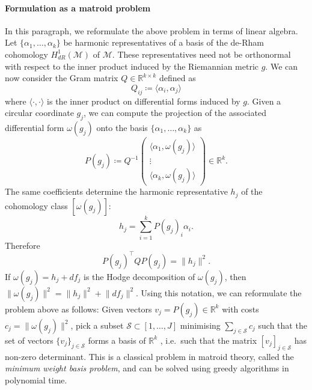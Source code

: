 \documentclass[a4paper,11pt, DIV=10]{scrartcl}
\numberwithin{equation}{section}
\theoremstyle{definition}
\theoremstyle{remark}
\newcommand{\R}{\mathbb{R}}
\newcommand{\mc}[1]{\mathcal{#1}}
\begin{document}
\paragraph{Formulation as a matroid problem}
In this paragraph, we reformulate the above problem in terms of linear algebra.
Let $\{\alpha_1,\dots, \alpha_k\}$ be harmonic representatives of a basis of the de-Rham cohomology $H^1_{dR}(\mc{M})$ of $\mc{M}$.
These representatives need not be orthonormal with respect to the inner product induced by the Riemannian metric $g$.
We can now consider the Gram matrix $Q\in \R^{k\times k}$ defined as
\begin{equation}
Q_{ij} \coloneq \langle \alpha_i, \alpha_j \rangle
\end{equation}
where $\langle \cdot, \cdot \rangle$ is the inner product on differential forms induced by $g$.
Given a circular coordinate $g_j$, we can compute the projection of the associated differential form $\omega (g_j)$ onto the basis $\{\alpha_1,\dots, \alpha_k\}$ as
\begin{equation}
P(g_j) \coloneq Q^{-1} \begin{pmatrix}
\langle \alpha_1, \omega (g_j) \rangle \\
\vdots \\
\langle \alpha_k, \omega (g_j) \rangle
\end{pmatrix} \in \R^k.
\end{equation}
The same coefficients determine the harmonic representative $h_j$ of the cohomology class $[\omega(g_j)]$:
\begin{equation}
h_j = \sum_{i=1}^k P(g_j)_i \alpha_i.
\end{equation}
Therefore
\begin{equation}
P(g_j)^\top Q P(g_j)=\lVert h_j\rVert^2.
\end{equation}
If $\omega(g_j)=h_j+df_j$ is the Hodge decomposition of $\omega(g_j)$, then $\lVert \omega(g_j)\rVert^2=\lVert h_j\rVert^2+\lVert df_j\rVert^2$.
Using this notation, we can reformulate the problem above as follows:
Given vectors $v_j = P(g_j) \in \R^k$ with costs $c_j = \lVert \omega (g_j) \rVert^2$, pick a subset $\mc{S}\subset [1,\dots, J]$ minimising $\sum_{j\in \mc{S}} c_j$ such that the set of vectors $\{v_j\}_{j\in \mc{S}}$ forms a basis of $\R^k$ , i.e.\ such that the matrix $[v_j]_{j\in \mc{S}}$ has non-zero determinant.
This is a classical problem in matroid theory, called the \emph{minimum weight basis problem}, and can be solved using greedy algorithms in polynomial time.
\end{document}
